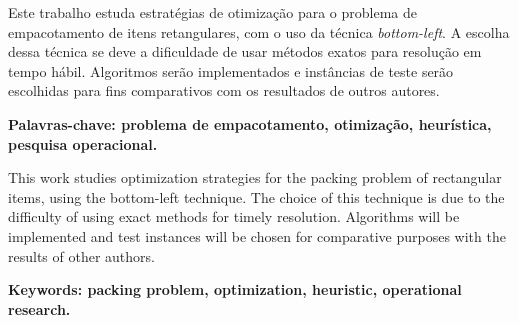 
\begin{resumo}
    Este trabalho estuda estratégias de otimização para o problema de empacotamento de itens retangulares, com o uso da técnica \textit{bottom-left}.
    A escolha dessa técnica se deve a dificuldade de usar métodos exatos para resolução em tempo hábil.
    Algoritmos serão implementados e instâncias de teste serão escolhidas para fins comparativos com os resultados de outros autores.

    \textbf{Palavras-chave: problema de empacotamento, otimização, heurística, pesquisa operacional.}
\end{resumo}
\newpage

\begin{resumo}[Abstract]
    This work studies optimization strategies for the packing problem of rectangular items, using the bottom-left technique.
    The choice of this technique is due to the difficulty of using exact methods for timely resolution.
    Algorithms will be implemented and test instances will be chosen for comparative purposes with the results of other authors.

    \textbf{Keywords: packing problem, optimization, heuristic, operational research.}
\end{resumo}
\newpage
